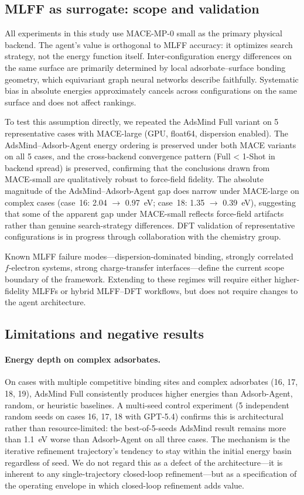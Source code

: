\subsection{MLFF as surrogate: scope and validation}

All experiments in this study use MACE-MP-0 small as the primary physical backend.
The agent's value is orthogonal to MLFF accuracy: it optimizes search strategy, not the energy function itself.
Inter-configuration energy differences on the same surface are primarily determined by local adsorbate--surface bonding geometry, which equivariant graph neural networks describe faithfully.
Systematic bias in absolute energies approximately cancels across configurations on the same surface and does not affect rankings.

To test this assumption directly, we repeated the AdsMind Full variant on 5 representative cases with MACE-large (GPU, float64, dispersion enabled).
The AdsMind--Adsorb-Agent energy ordering is preserved under both MACE variants on all 5 cases, and the cross-backend convergence pattern (Full < 1-Shot in backend spread) is preserved, confirming that the conclusions drawn from MACE-small are qualitatively robust to force-field fidelity.
The absolute magnitude of the AdsMind--Adsorb-Agent gap does narrow under MACE-large on complex cases (case~16: 2.04 $\to$ 0.97~eV; case~18: 1.35 $\to$ 0.39~eV), suggesting that some of the apparent gap under MACE-small reflects force-field artifacts rather than genuine search-strategy differences.
DFT validation of representative configurations is in progress through collaboration with the chemistry group.

Known MLFF failure modes---dispersion-dominated binding, strongly correlated $f$-electron systems, strong charge-transfer interfaces---define the current scope boundary of the framework.
Extending to these regimes will require either higher-fidelity MLFFs or hybrid MLFF--DFT workflows, but does not require changes to the agent architecture.

\subsection{Limitations and negative results}

\paragraph{Energy depth on complex adsorbates.}
On cases with multiple competitive binding sites and complex adsorbates (16, 17, 18, 19), AdsMind Full consistently produces higher energies than Adsorb-Agent, random, or heuristic baselines.
A multi-seed control experiment (5 independent random seeds on cases 16, 17, 18 with GPT-5.4) confirms this is architectural rather than resource-limited: the best-of-5-seeds AdsMind result remains more than 1.1~eV worse than Adsorb-Agent on all three cases.
The mechanism is the iterative refinement trajectory's tendency to stay within the initial energy basin regardless of seed.
We do not regard this as a defect of the architecture---it is inherent to any single-trajectory closed-loop refinement---but as a specification of the operating envelope in which closed-loop refinement adds value.

